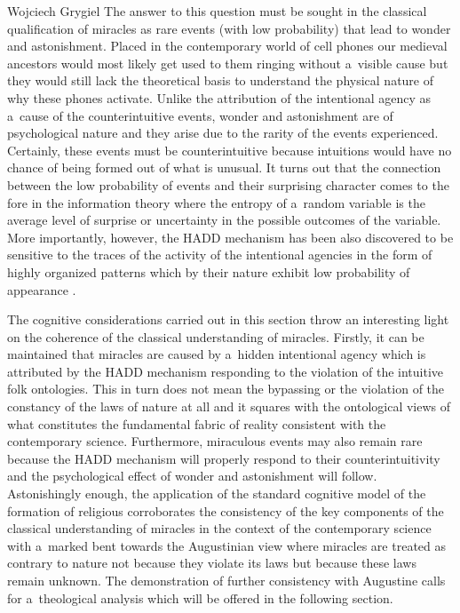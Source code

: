 \begin{artengenv}{Wojciech Grygiel}
The answer to this question must be sought in the classical qualification of miracles as rare events (with low probability) that lead to wonder and astonishment. Placed in the contemporary world of cell phones our medieval ancestors would most likely get used to them ringing without a~visible cause but they would still lack the theoretical basis to understand the physical nature of why these phones activate. Unlike the attribution of the intentional agency as a~cause of the counterintuitive events, wonder and astonishment are of psychological nature and they arise due to the rarity of the events experienced. Certainly, these events must be counterintuitive because intuitions would have no chance of being formed out of what is unusual. It turns out that the connection between the low probability of events and their surprising character comes to the fore in the information theory where the entropy of a~random variable is the average level of surprise or uncertainty in the possible outcomes of the variable. More importantly, however, the HADD mechanism has been also discovered to be sensitive to the traces of the activity of the intentional agencies in the form of highly organized patterns which by their nature exhibit low probability of appearance
\parencites[][pp.36–39]{barrett_why_2004}[][]{grygiel_doctrine_2020}.%


The cognitive considerations carried out in this section throw an interesting light on the coherence of the classical understanding of miracles. Firstly, it can be maintained that miracles are caused by a~hidden intentional agency which is attributed by the HADD mechanism responding to the violation of the intuitive folk ontologies. This in turn does not mean the bypassing or the violation of the constancy of the laws of nature at all and it squares with the ontological views of what constitutes the fundamental fabric of reality consistent with the contemporary science. Furthermore, miraculous events may also remain rare because the HADD mechanism will properly respond to their counterintuitivity and the psychological effect of wonder and astonishment will follow. Astonishingly enough, the application of the standard cognitive model of the formation of religious corroborates the consistency of the key components of the classical understanding of miracles in the context of the contemporary science with a~marked bent towards the Augustinian view where miracles are treated as contrary to nature not because they violate its laws but because these laws remain unknown. The demonstration of further consistency with Augustine calls for a~theological analysis which will be offered in the following section.


\end{artengenv}
